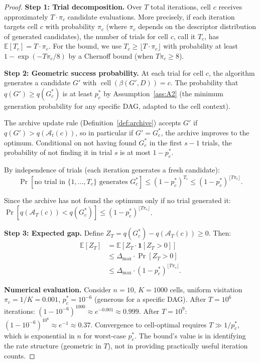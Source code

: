 \documentclass{article}
\theoremstyle{definition}
\theoremstyle{plain}
\theoremstyle{remark}
\DeclareMathOperator{\cell}{cell}
\begin{document}
\begin{proof}
\textbf{Step 1: Trial decomposition.}
Over $T$ total iterations, cell $c$ receives approximately $T \cdot \pi_c$
candidate evaluations. More precisely, if each iteration targets cell $c$ with
probability $\pi_c$ (where $\pi_c$ depends on the descriptor distribution of
generated candidates), the number of trials for cell $c$, call it $T_c$, has
$\mathbb{E}[T_c] = T \cdot \pi_c$. For the bound, we use
$T_c \geq \lfloor T \cdot \pi_c \rfloor$ with probability at least
$1 - \exp(-T\pi_c / 8)$ by a Chernoff bound (when $T\pi_c \geq 8$).

\textbf{Step 2: Geometric success probability.}
At each trial for cell $c$, the algorithm generates a candidate $G'$ with
$\cell(\beta(G', D)) = c$. The probability that $q(G') \geq q(G_c^*)$ is at
least $p_c^*$ by Assumption~\ref{ass:A2} (the minimum generation probability for
any specific DAG, adapted to the cell context).

The archive update rule (Definition~\ref{def:archive}) accepts $G'$ if
$q(G') > q(\mathcal{A}_t(c))$, so in particular if $G' = G_c^*$, the archive
improves to the optimum. Conditional on not having found $G_c^*$ in the first
$s-1$ trials, the probability of not finding it in trial $s$ is at most
$1 - p_c^*$.

By independence of trials (each iteration generates a fresh candidate):
$$\Pr[\text{no trial in } \{1, \ldots, T_c\} \text{ generates } G_c^*]
\leq (1 - p_c^*)^{T_c} \leq (1 - p_c^*)^{\lfloor T \pi_c \rfloor}.$$

Since the archive has not found the optimum only if no trial generated it:
$\Pr[q(\mathcal{A}_T(c)) < q(G_c^*)] \leq (1 - p_c^*)^{\lfloor T \pi_c \rfloor}$.

\textbf{Step 3: Expected gap.}
Define $Z_T = q(G_c^*) - q(\mathcal{A}_T(c)) \geq 0$. Then:
\begin{align}
  \mathbb{E}[Z_T]
  &= \mathbb{E}[Z_T \cdot \mathbf{1}[Z_T > 0]] \\
  &\leq \Delta_{\max} \cdot \Pr[Z_T > 0] \\
  &\leq \Delta_{\max} \cdot (1 - p_c^*)^{\lfloor T \pi_c \rfloor}.
\end{align}

\textbf{Numerical evaluation.}
Consider $n = 10$, $K = 1000$ cells, uniform visitation $\pi_c = 1/K = 0.001$,
$p_c^* = 10^{-6}$ (generous for a specific DAG). After $T = 10^6$ iterations:
$(1 - 10^{-6})^{1000} \approx e^{-0.001} \approx 0.999$.
After $T = 10^9$: $(1 - 10^{-6})^{10^6} \approx e^{-1} \approx 0.37$.
Convergence to cell-optimal requires $T \gg 1/p_c^*$, which is exponential in $n$
for worst-case $p_c^*$. The bound's value is in identifying the rate structure
(geometric in $T$), not in providing practically useful iteration counts.
\end{proof}
\end{document}
